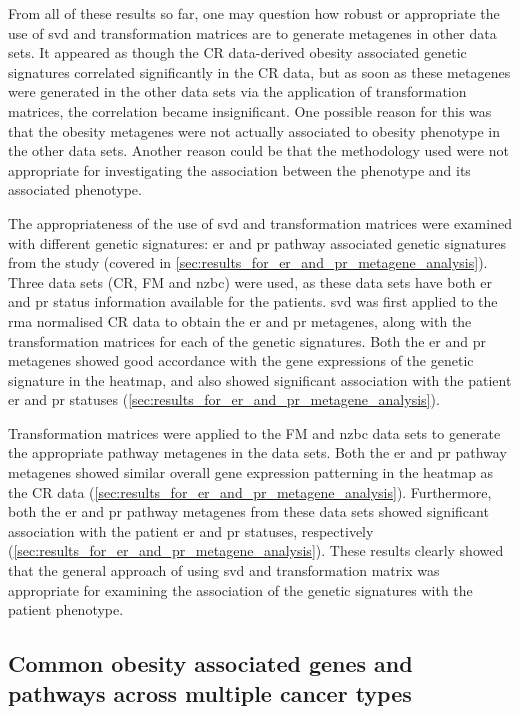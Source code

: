 From all of these results so far, one may question how robust or appropriate the use of \gls{svd} and transformation matrices are to generate metagenes in other data sets.
It appeared as though the CR data-derived obesity associated genetic signatures correlated significantly in the CR data, but as soon as these metagenes were generated in the other data sets via the application of transformation matrices, the correlation became insignificant.
One possible reason for this was that the obesity metagenes were not actually associated to obesity phenotype in the other data sets.
Another reason could be that the methodology used were not appropriate for investigating the association between the phenotype and its associated phenotype.

The appropriateness of the use of \gls{svd} and transformation matrices were examined with different genetic signatures: \gls{er} and \gls{pr} pathway associated genetic signatures from the \citet{Gatza2010a} study (covered in \cref{sec:results_for_er_and_pr_metagene_analysis}).
Three data sets (CR, FM and \gls{nzbc}) were used, as these data sets have both \gls{er} and \gls{pr} status information available for the patients.
\gls{svd} was first applied to the \gls{rma} normalised CR data to obtain the \gls{er} and \gls{pr} metagenes, along with the transformation matrices for each of the genetic signatures.
Both the \gls{er} and \gls{pr} metagenes showed good accordance with the gene expressions of the genetic signature in the heatmap, and also showed significant association with the patient \gls{er} and \gls{pr} statuses (\cref{sec:results_for_er_and_pr_metagene_analysis}).

Transformation matrices were applied to the FM and \gls{nzbc} data sets to generate the appropriate pathway metagenes in the data sets.
Both the \gls{er} and \gls{pr} pathway metagenes showed similar overall gene expression patterning in the heatmap as the CR data (\cref{sec:results_for_er_and_pr_metagene_analysis}).
Furthermore, both the \gls{er} and \gls{pr} pathway metagenes from these data sets showed significant association with the patient \gls{er} and \gls{pr} statuses, respectively (\cref{sec:results_for_er_and_pr_metagene_analysis}).
These results clearly showed that the general approach of using \gls{svd} and transformation matrix was appropriate for examining the association of the genetic signatures with the patient phenotype.

\subsection{Common obesity associated genes and pathways across multiple cancer types}
\label{sub:common_obesity_associated_genes_and_pathways_across_multiple_cancer_types}

